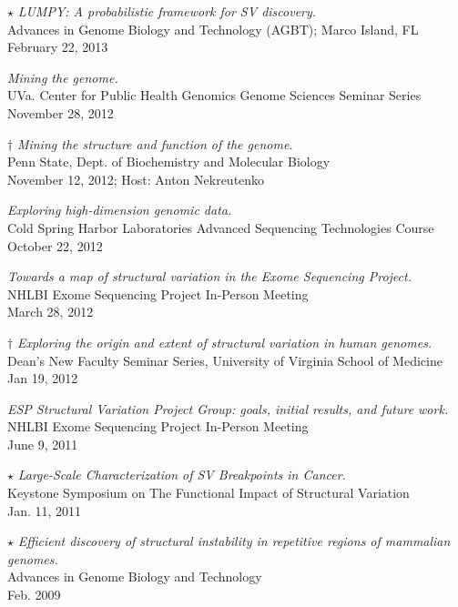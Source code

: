 \documentclass[margin,line]{cv}
\begin{document}
\begin{resume}
    $\star$ \textit{LUMPY: A probabilistic framework for SV discovery.} \\
    Advances in Genome Biology and Technology (AGBT); Marco Island, FL \\
    February 22, 2013

    \textit{Mining the genome.} \\
    UVa. Center for Public Health Genomics Genome Sciences Seminar Series \\
    November 28, 2012

    $\dagger$ \textit{Mining the structure and function of the genome.} \\
    Penn State, Dept. of Biochemistry and Molecular Biology \\
    November 12, 2012; Host: Anton Nekreutenko

    \textit{Exploring high-dimension genomic data.} \\
    Cold Spring Harbor Laboratories Advanced Sequencing Technologies Course \\
    October 22, 2012

    \textit{Towards a map of structural variation in the Exome Sequencing Project.} \\
    NHLBI Exome Sequencing Project In-Person Meeting \\
    March 28, 2012

    $\dagger$ \textit{Exploring the origin and extent of structural variation in human genomes.} \\
    Dean’s New Faculty Seminar Series, University of Virginia School of Medicine \\
    Jan 19, 2012

    \textit{ESP Structural Variation Project Group: goals, initial results, and future work.} \\
    NHLBI Exome Sequencing Project In-Person Meeting \\
    June 9, 2011

    $\star$ \textit{Large-Scale Characterization of SV Breakpoints in Cancer.} \\
    Keystone Symposium on The Functional Impact of Structural Variation \\
    Jan. 11, 2011

    $\star$ \textit{Efficient discovery of structural instability in repetitive regions of mammalian genomes.} \\
    Advances in Genome Biology and Technology \\
    Feb. 2009


\end{resume}
\end{document}
